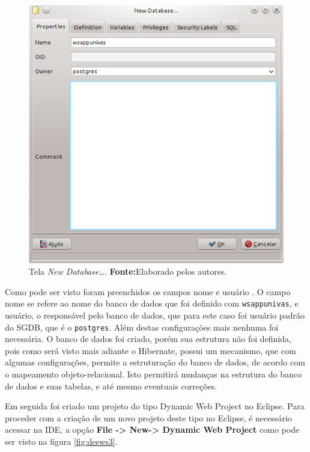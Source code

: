 	\begin{figure}[h!]
		\centerline{\includegraphics[scale=1]{./imagens/2_q_metodologico/4_procedimentos_resultados/43_webservice/432_desenvolvimento/desws2.png}}
		\caption[Tela \textit{New Database\ldots}]{Tela \textit{New Database\ldots}.
			\textbf{Fonte:}Elaborado pelos autores.}
		\label{fig:desws2}
	\end{figure}
	
	\pagebreak

	\par Como pode ser visto foram preenchidos os campos nome e usuário . O campo
nome se refere ao nome do banco de dados que foi definido com
\texttt{wsappunivas}, e usuário, o responsável pelo banco de dados, que para
este caso foi usuário padrão do SGDB, que é o \texttt{postgres}. Além destas
configurações mais nenhuma foi necessária. O banco de dados foi criado, porém
sua estrutura não foi definida, pois como será visto mais adiante o Hibernate,
possui um mecanismo, que com algumas configurações, permite a estruturação do
banco de dados, de acordo com o mapeamento objeto-relacional. Isto permitirá
mudanças na estrutura do banco de dados e suas tabelas, e até mesmo eventuais
correções.
	
	\par Em seguida foi criado um projeto do tipo Dynamic Web Project no
Eclipse. Para proceder com a criação de um novo projeto deste tipo no Eclipse, é
necessário acessar na IDE, a opção \textbf{File -> New-> Dynamic Web Project}
como pode ser visto na figura \ref{fig:desws3}.

